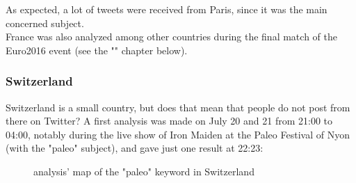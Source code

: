 \documentclass[a4paper,11pt]{report}
\begin{document}
As expected, a lot of tweets were received from Paris, since it was the main concerned subject.\\

France was also analyzed among other countries during the final match of the Euro2016 event (see the "" chapter below).
\newpage

\subsubsection{Switzerland}
Switzerland is a small country, but does that mean that people do not post from there on Twitter? A first analysis was made on July 20 and 21 from 21:00 to 04:00, notably during the live show of Iron Maiden at the Paleo Festival of Nyon (with the "paleo" subject), and gave just one result at 22:23:
\begin{figure}[H]
\vspace{-5pt}
\begin{center}
\vspace{-5pt}
\caption{analysis' map of the "paleo" keyword in Switzerland}
\end{center}
\end{figure}
\vspace{-10pt}
\end{document}
